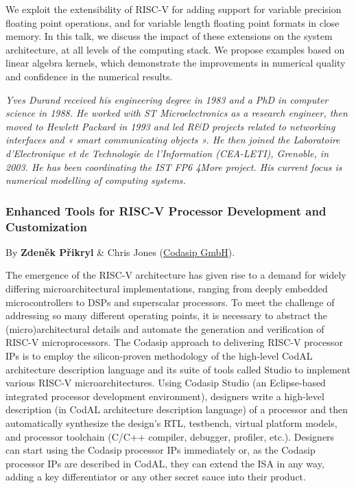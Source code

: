 \documentclass[a4paper, 10pt]{article}
\begin{document}
{We exploit the extensibility of RISC-V for adding support for variable
precision floating point operations, and for variable length floating
point formats in close memory. In this talk, we discuss the impact of
these extensions on the system architecture, at all levels of the
computing stack. We propose examples based on linear algebra kernels,
which demonstrate the improvements in numerical quality and confidence
in the numerical results.

\emph{\footnotesize Yves Durand received his engineering degree in 1983 and a PhD in computer science in 1988. He worked with ST Microelectronics as a research engineer, then moved to Hewlett Packard in 1993 and led R\&D projects related to networking interfaces and « smart communicating objects ». He then joined the Laboratoire d'Electronique et de Technologie de l'Information (CEA-LETI), Grenoble, in 2003. He has been coordinating the IST FP6 4More project. His current focus is numerical modelling of computing systems.}

\subsubsection{Enhanced Tools for RISC-V Processor Development and Customization}
\label{sec:org8b6a149}
By \textbf{Zdeněk Přikryl} \& Chris Jones (\href{http://www.codasip.com}{Codasip
GmbH}).

The emergence of the RISC-V architecture has given rise to a demand
for widely differing microarchitectural implementations, ranging from
deeply embedded microcontrollers to DSPs and superscalar
processors. To meet the challenge of addressing so many different
operating points, it is necessary to abstract the (micro)architectural
details and automate the generation and verification of RISC-V
microprocessors. The Codasip approach to delivering RISC-V processor
IPs is to employ the silicon-proven methodology of the high-level
CodAL architecture description language and its suite of tools called
Studio to implement various RISC-V microarchitectures. Using Codasip
Studio (an Eclipse-based integrated processor development
environment), designers write a high-level description (in CodAL
architecture description language) of a processor and then
automatically synthesize the design’s RTL, testbench, virtual platform
models, and processor toolchain (C/C++ compiler, debugger, profiler,
etc.). Designers can start using the Codasip processor IPs immediately
or, as the Codasip processor IPs are described in CodAL, they can
extend the ISA in any way, adding a key differentiator or any other
secret sauce into their product.

}
\end{document}
